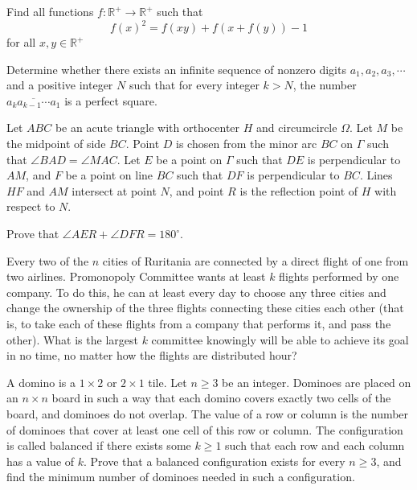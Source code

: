 \documentclass[11pt]{scrartcl}
\begin{document}
\begin{problem}[226941582419522]
	Find all functions $f : \mathbb{R^{+}}\to \mathbb{R^{+}}$ such that$$f(x)^2=f(xy)+f(x+f(y))-1$$for all $x, y\in \mathbb{R^{+}}$
\end{problem}
\begin{problem}[227872694827710]
Determine whether there exists an infinite sequence of nonzero digits $a_1 , a_2 , a_3 , \cdots $ and a positive integer $N$ such that for every integer $k > N$, the number $\overline{a_k a_{k-1}\cdots a_1 }$ is a perfect square.
\end{problem}
\begin{problem}[227919487650283]
Let $ABC$ be an acute triangle with orthocenter $H$ and circumcircle $\Omega$. Let $M$ be the midpoint of side $BC$. Point $D$ is chosen from the minor arc $BC$ on $\Gamma$ such that $\angle BAD = \angle MAC$. Let $E$ be a point on $\Gamma$ such that $DE$ is perpendicular to $AM$, and $F$ be a point on line $BC$ such that $DF$ is perpendicular to $BC$. Lines $HF$ and $AM$ intersect at point $N$, and point $R$ is the reflection point of $H$ with respect to $N$.

Prove that $\angle AER + \angle DFR = 180^\circ$.
\end{problem}
\begin{problem}[231259391294064]
Every two of the $n$ cities of Ruritania are connected by a direct flight of one from two airlines. Promonopoly Committee wants at least $k$ flights performed by one company. To do this, he can at least every day to choose any three cities and change the ownership of the three flights connecting these cities each other (that is, to take each of these flights from a company that performs it, and pass the other). What is the largest $k$ committee knowingly will be able to achieve its goal in no time, no matter how the flights are distributed hour?
\end{problem}
\begin{problem}[232495612059721]
	A domino is a $ 1 \times 2 $ or $ 2 \times 1 $ tile.
Let $n \ge 3 $ be an integer. Dominoes are placed on an $n \times n$ board in such a way that each domino covers exactly two cells of the board, and dominoes do not overlap. The value of a row or column is the number of dominoes that cover at least one cell of this row or column. The configuration is called balanced if there exists some $k \ge 1 $ such that each row and each column has a value of $k$. Prove that a balanced configuration exists for every $n \ge 3 $, and find the minimum number of dominoes needed in such a configuration.
\end{problem}
\end{document}
